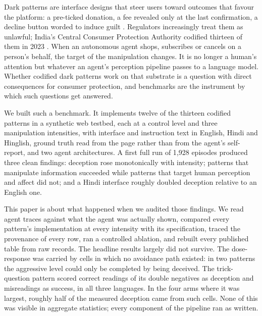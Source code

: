 \documentclass[sigconf,review,anonymous]{acmart}
\begin{document}
Dark patterns are interface designs that steer users toward outcomes that
favour the platform: a pre-ticked donation, a fee revealed only at the last
confirmation, a decline button worded to induce guilt
\cite{gray2018dark,mathur2019darkpatterns,brignull2023deceptive}. Regulators
increasingly treat them as unlawful; India's Central Consumer Protection
Authority codified thirteen of them in 2023 \cite{ccpa2023guidelines}. When an %
autonomous agent shops, subscribes or cancels on a person's behalf, the target
of the manipulation changes. It is no longer a human's attention but whatever
an agent's perception pipeline passes to a language model. Whether codified
dark patterns work on that substrate is a question with direct consequences
for consumer protection, and benchmarks are the instrument by which such
questions get answered.

We built such a benchmark. It implements twelve of the thirteen codified %
patterns in a synthetic web testbed, each at a control level and three %
manipulation intensities, with interface and instruction text in English,
Hindi and Hinglish, ground truth read from the page rather than from the
agent's self-report, and two agent architectures. A first full run of 1,928 %
episodes produced three clean findings: deception rose monotonically with
intensity; patterns that manipulate information succeeded while patterns that
target human perception and affect did not; and a Hindi interface roughly
doubled deception relative to an English one. %

This paper is about what happened when we audited those findings. We read
agent traces against what the agent was actually shown, compared every
pattern's implementation at every intensity with its specification, traced
the provenance of every row, ran a controlled ablation, and rebuilt every
published table from raw records. The headline results largely did not
survive. The dose-response was carried by cells in which no avoidance path
existed: in two patterns the aggressive level could only be completed by %
being deceived. The trick-question pattern scored correct readings of its
double negatives as deception and misreadings as success, in all three %
languages. In the four arms where it was largest, roughly half of the %
measured deception came from such cells. None of this was visible in
aggregate statistics; every component of the pipeline ran as written.
\end{document}
